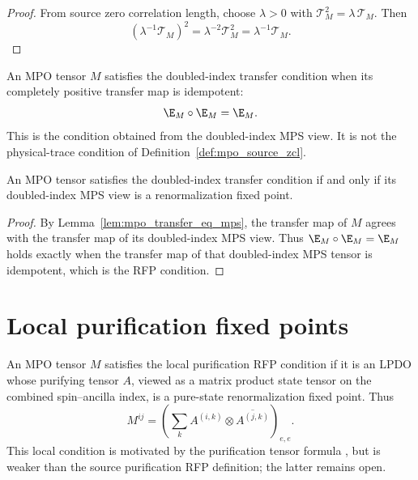 \begin{proof}
    \leanok
    From source zero correlation length, choose $\lambda>0$ with
    $\mathcal T_M^2=\lambda\,\mathcal T_M$. Then
    \[
        (\lambda^{-1}\mathcal T_M)^2
        =
        \lambda^{-2}\mathcal T_M^2
        =
        \lambda^{-1}\mathcal T_M .
    \]
\end{proof}

\begin{definition}%
    \label{def:mpo_is_zcl}
    \leanok
    An MPO tensor $M$ satisfies the doubled-index transfer condition when its
    completely positive transfer map is idempotent:
    \[
        \E_M \circ \E_M = \E_M.
    \]
    This is the condition obtained from the doubled-index MPS view. It is not
    the physical-trace condition of Definition~\ref{def:mpo_source_zcl}.
\end{definition}

\begin{theorem}%
    \label{thm:mpo_is_zcl_iff_to_mps_rfp}
    \leanok
    An MPO tensor satisfies the doubled-index transfer condition if and only if
    its doubled-index MPS view is a renormalization fixed point.
\end{theorem}

\begin{proof}
    \leanok
    By Lemma~\ref{lem:mpo_transfer_eq_mps}, the transfer map of $M$ agrees with
    the transfer map of its doubled-index MPS view. Thus
    $\E_M \circ \E_M = \E_M$ holds exactly when the transfer map of
    that doubled-index MPS tensor is idempotent, which is the RFP condition.
\end{proof}

\section{Local purification fixed points}

\begin{definition}\label{def:is_local_purification_rfp}
    \leanok
    An MPO tensor $M$ satisfies the local purification RFP condition if it is an
    LPDO whose purifying tensor $A$, viewed as a matrix product state tensor on
    the combined spin--ancilla index, is a pure-state renormalization fixed point.
    Thus
    \[
        M^{ij}
        =
        \left(\sum_{k} A^{(i,k)} \otimes \overline{A^{(j,k)}}\right)_{e,e}.
    \]
    This local condition is motivated by the purification tensor formula
    \cite[lines~744--747]{Cirac2016MPDO_arXiv}, but is weaker than the source
    purification RFP definition; the latter remains open.
\end{definition}

